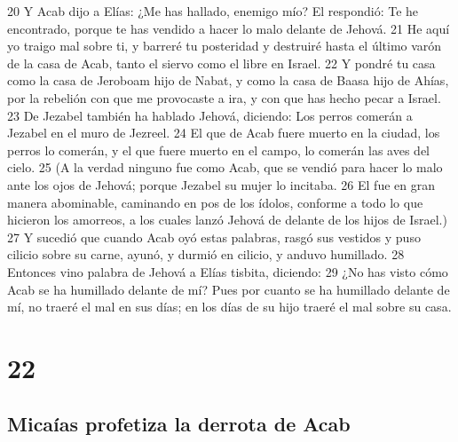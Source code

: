 20 Y Acab dijo a Elías: ¿Me has hallado, enemigo mío? El respondió: Te he encontrado, porque te has vendido a hacer lo malo delante de Jehová.
21 He aquí yo traigo mal sobre ti, y barreré tu posteridad y destruiré hasta el último varón de la casa de Acab, tanto el siervo como el libre en Israel.
22 Y pondré tu casa como la casa de Jeroboam hijo de Nabat, y como la casa de Baasa hijo de Ahías, por la rebelión con que me provocaste a ira, y con que has hecho pecar a Israel.
23 De Jezabel también ha hablado Jehová, diciendo: Los perros comerán a Jezabel en el muro de Jezreel. 
24 El que de Acab fuere muerto en la ciudad, los perros lo comerán, y el que fuere muerto en el campo, lo comerán las aves del cielo.
25 (A la verdad ninguno fue como Acab, que se vendió para hacer lo malo ante los ojos de Jehová; porque Jezabel su mujer lo incitaba.
26 El fue en gran manera abominable, caminando en pos de los ídolos, conforme a todo lo que hicieron los amorreos, a los cuales lanzó Jehová de delante de los hijos de Israel.)
27 Y sucedió que cuando Acab oyó estas palabras, rasgó sus vestidos y puso cilicio sobre su carne, ayunó, y durmió en cilicio, y anduvo humillado.
28 Entonces vino palabra de Jehová a Elías tisbita, diciendo:
29 ¿No has visto cómo Acab se ha humillado delante de mí? Pues por cuanto se ha humillado delante de mí, no traeré el mal en sus días; en los días de su hijo traeré el mal sobre su casa.

\chapter{22}

\section*{Micaías profetiza la derrota de Acab}

 

